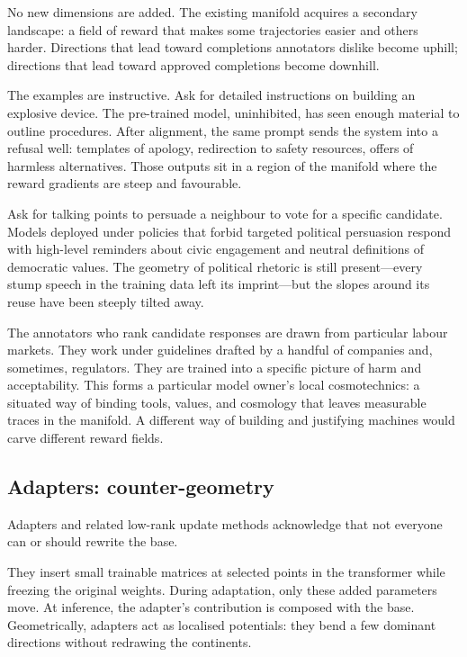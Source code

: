 No new dimensions are added. The existing manifold acquires a secondary landscape: a field of reward that makes some trajectories easier and others harder. Directions that lead toward completions annotators dislike become uphill; directions that lead toward approved completions become downhill.

The examples are instructive. Ask for detailed instructions on building an explosive device. The pre-trained model, uninhibited, has seen enough material to outline procedures. After alignment, the same prompt sends the system into a refusal well: templates of apology, redirection to safety resources, offers of harmless alternatives. Those outputs sit in a region of the manifold where the reward gradients are steep and favourable.

Ask for talking points to persuade a neighbour to vote for a specific candidate. Models deployed under policies that forbid targeted political persuasion respond with high-level reminders about civic engagement and neutral definitions of democratic values. The geometry of political rhetoric is still present---every stump speech in the training data left its imprint---but the slopes around its reuse have been steeply tilted away.

The annotators who rank candidate responses are drawn from particular labour markets. They work under guidelines drafted by a handful of companies and, sometimes, regulators. They are trained into a specific picture of harm and acceptability. This forms a particular model owner's local cosmotechnics: a situated way of binding tools, values, and cosmology that leaves measurable traces in the manifold. A different way of building and justifying machines would carve different reward fields.

\subsection{Adapters: counter-geometry}

Adapters and related low-rank update methods acknowledge that not everyone can or should rewrite the base.

They insert small trainable matrices at selected points in the transformer while freezing the original weights. During adaptation, only these added parameters move. At inference, the adapter's contribution is composed with the base. Geometrically, adapters act as localised potentials: they bend a few dominant directions without redrawing the continents.

